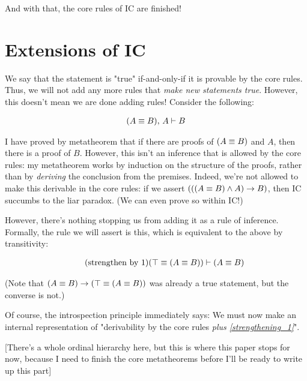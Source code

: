 \documentclass{article}
\begin{document}
  And with that, the core rules of IC are finished!
  
  \section{Extensions of IC}
  
  We say that the statement is "true" if-and-only-if it is provable by the core rules. Thus, we will not add any more rules that \emph{make new statements true}. However, this doesn't mean we are done adding rules! Consider the following:
  
  \begin{align*}
    (A \equiv B) ,\, A &\vdash B \\
  \end{align*}
  
  I have proved by metatheorem that if there are proofs of $(A \equiv B)$ and $A$, then there is a proof of $B$. However, this isn't an inference that is allowed by the core rules: my metatheorem works by induction on the structure of the proofs, rather than by \emph{deriving} the conclusion from the premises. Indeed, we're not allowed to make this derivable in the core rules: if we assert $(((A \equiv B) \wedge A) \to B)$, then IC succumbs to the liar paradox. (We can even prove so within IC!)
  
  However, there's nothing stopping us from adding it as a rule of inference. Formally, the rule we will assert is this, which is equivalent to the above by transitivity:
  
  \begin{align*}
    \tag{strengthen by 1}\label{strengthening_1}
    (\top \equiv (A \equiv B)) &\vdash (A \equiv B) \\
  \end{align*}
  
  (Note that $(A \equiv B) \to (\top \equiv (A \equiv B))$ was already a true statement, but the converse is not.)
  
  Of course, the introspection principle immediately says: We must now make an internal representation of "derivability by the core rules \emph{plus \eqref{strengthening_1}}".
  
  [There's a whole ordinal hierarchy here, but this is where this paper stops for now, because I need to finish the core metatheorems before I'll be ready to write up this part]
  
  
\end{document}
